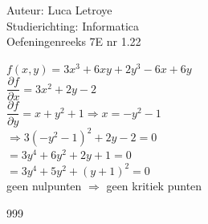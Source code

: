 \documentclass[a4paper]{article}
\begin{document}
  
\noindent \large Auteur: Luca Letroye \\
\noindent \large Studierichting: Informatica\\
\noindent \large Oefeningenreeks 7E nr 1.22\\

\medskip

\normalsize

$f(x,y) = 3x^3+6xy+2y^3-6x+6y$\\

$\dfrac{\partial f}{\partial x} = 3x^2+2y-2 $\\

$\dfrac{\partial f}{\partial y} = x+y^2+1 \Rightarrow x = -y^2-1 $\\

$\Rightarrow 3(-y^2-1)^2+2y -2 = 0$\\

$ = 3y^4+6y^2+2y+1 = 0$\\

$ = 3y^4+5y^2 +(y+1)^2= 0$\\

geen nulpunten $\Rightarrow$ geen kritiek punten




\begin{thebibliography}{999}
\end{thebibliography}
\end{document}
